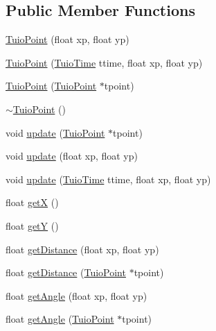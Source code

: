 \subsection*{Public Member Functions}
\begin{DoxyCompactItemize}
\item 
\hyperlink{class_t_u_i_o_1_1_tuio_point_a8611528cf41b797c51d6a9bf324157a5}{Tuio\+Point} (float xp, float yp)
\item 
\hyperlink{class_t_u_i_o_1_1_tuio_point_a532785ad9572b0e04a0030eac0de99c0}{Tuio\+Point} (\hyperlink{class_t_u_i_o_1_1_tuio_time}{Tuio\+Time} ttime, float xp, float yp)
\item 
\hyperlink{class_t_u_i_o_1_1_tuio_point_a816f61587a26fcc44aaa97f587599737}{Tuio\+Point} (\hyperlink{class_t_u_i_o_1_1_tuio_point}{Tuio\+Point} $\ast$tpoint)
\item 
\hyperlink{class_t_u_i_o_1_1_tuio_point_acbfa3e1e22467fb1fb767dc5c0863057}{$\sim$\+Tuio\+Point} ()
\item 
void \hyperlink{class_t_u_i_o_1_1_tuio_point_aa1cc8711747080dd00eb50577d73d038}{update} (\hyperlink{class_t_u_i_o_1_1_tuio_point}{Tuio\+Point} $\ast$tpoint)
\item 
void \hyperlink{class_t_u_i_o_1_1_tuio_point_a469e531b2847c58aa77486c0ccc15ce6}{update} (float xp, float yp)
\item 
void \hyperlink{class_t_u_i_o_1_1_tuio_point_ad6c108b1facf3972af52716f49b4aa3e}{update} (\hyperlink{class_t_u_i_o_1_1_tuio_time}{Tuio\+Time} ttime, float xp, float yp)
\item 
float \hyperlink{class_t_u_i_o_1_1_tuio_point_ad5bb767c0a7b151704b59a38793345f0}{getX} ()
\item 
float \hyperlink{class_t_u_i_o_1_1_tuio_point_a6c591de33c3c0f0d5e8df159ce643b7a}{getY} ()
\item 
float \hyperlink{class_t_u_i_o_1_1_tuio_point_ab73aa4898ec2db72bd64b029473a8069}{get\+Distance} (float xp, float yp)
\item 
float \hyperlink{class_t_u_i_o_1_1_tuio_point_a2d1a0aa81271bbd2b1a43b0439706f4d}{get\+Distance} (\hyperlink{class_t_u_i_o_1_1_tuio_point}{Tuio\+Point} $\ast$tpoint)
\item 
float \hyperlink{class_t_u_i_o_1_1_tuio_point_ad4ca45ad0fdccc6f55b5af79189e7872}{get\+Angle} (float xp, float yp)
\item 
float \hyperlink{class_t_u_i_o_1_1_tuio_point_ac2598b8fe91f7417069a1c0e294bf6e4}{get\+Angle} (\hyperlink{class_t_u_i_o_1_1_tuio_point}{Tuio\+Point} $\ast$tpoint)
\item 

\end{DoxyCompactItemize}

